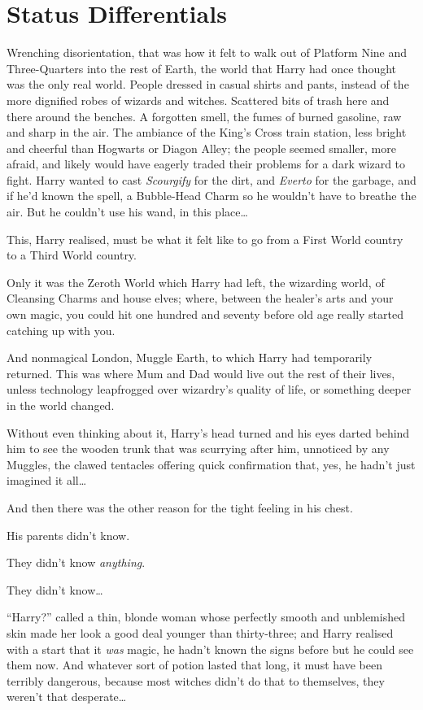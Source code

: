 \chapter{Status Differentials}\label{status-differentials}

Wrenching disorientation, that was how it felt to walk out of Platform
Nine and Three-Quarters into the rest of Earth, the world that Harry had
once thought was the only real world. People dressed in casual shirts
and pants, instead of the more dignified robes of wizards and witches.
Scattered bits of trash here and there around the benches. A forgotten
smell, the fumes of burned gasoline, raw and sharp in the air. The
ambiance of the King's Cross train station, less bright and cheerful
than Hogwarts or Diagon Alley; the people seemed smaller, more afraid,
and likely would have eagerly traded their problems for a dark wizard to
fight. Harry wanted to cast \emph{Scourgify} for the dirt, and
\emph{Everto} for the garbage, and if he'd known the spell, a
Bubble-Head Charm so he wouldn't have to breathe the air. But he
couldn't use his wand, in this place\ldots{}

This, Harry realised, must be what it felt like to go from a First World
country to a Third World country.

Only it was the Zeroth World which Harry had left, the wizarding world,
of Cleansing Charms and house elves; where, between the healer's arts
and your own magic, you could hit one hundred and seventy before old age
really started catching up with you.

And nonmagical London, Muggle Earth, to which Harry had temporarily
returned. This was where Mum and Dad would live out the rest of their
lives, unless technology leapfrogged over wizardry's quality of life, or
something deeper in the world changed.

Without even thinking about it, Harry's head turned and his eyes darted
behind him to see the wooden trunk that was scurrying after him,
unnoticed by any Muggles, the clawed tentacles offering quick
confirmation that, yes, he hadn't just imagined it all\ldots{}

And then there was the other reason for the tight feeling in his chest.

His parents didn't know.

They didn't know \emph{anything}.

They didn't know\ldots{}

``Harry?'' called a thin, blonde woman whose perfectly smooth and
unblemished skin made her look a good deal younger than thirty-three;
and Harry realised with a start that it \emph{was} magic, he hadn't
known the signs before but he could see them now. And whatever sort of
potion lasted that long, it must have been terribly dangerous, because
most witches didn't do that to themselves, they weren't that
desperate\ldots{}

